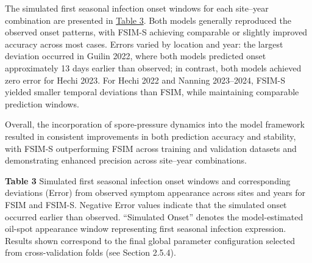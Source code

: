 \documentclass[
]{article}
\begin{document}
The simulated first seasonal infection onset windows for each site--year
combination are presented in \hyperref[_Ref214273041]{Table 3}. Both
models generally reproduced the observed onset patterns, with FSIM-S
achieving comparable or slightly improved accuracy across most cases.
Errors varied by location and year: the largest deviation occurred in
Guilin 2022, where both models predicted onset approximately 13 days
earlier than observed; in contrast, both models achieved zero error for
Hechi 2023. For Hechi 2022 and Nanning 2023--2024, FSIM-S yielded
smaller temporal deviations than FSIM, while maintaining comparable
prediction windows.

Overall, the incorporation of spore-pressure dynamics into the model
framework resulted in consistent improvements in both prediction
accuracy and stability, with FSIM-S outperforming FSIM across training
and validation datasets and demonstrating enhanced precision across
site--year combinations.

\protect{}\label{_Ref214273041}{}
\begin{center}
\textbf{Table 3} Simulated first seasonal infection onset windows and
corresponding deviations (Error) from observed symptom appearance across
sites and years for FSIM and FSIM-S. Negative Error values indicate that
the simulated onset occurred earlier than observed. ``Simulated Onset''
denotes the model-estimated oil-spot appearance window representing
first seasonal infection expression. Results shown correspond to the
final global parameter configuration selected from cross-validation
folds (see Section 2.5.4).
\end{center}
\end{document}
